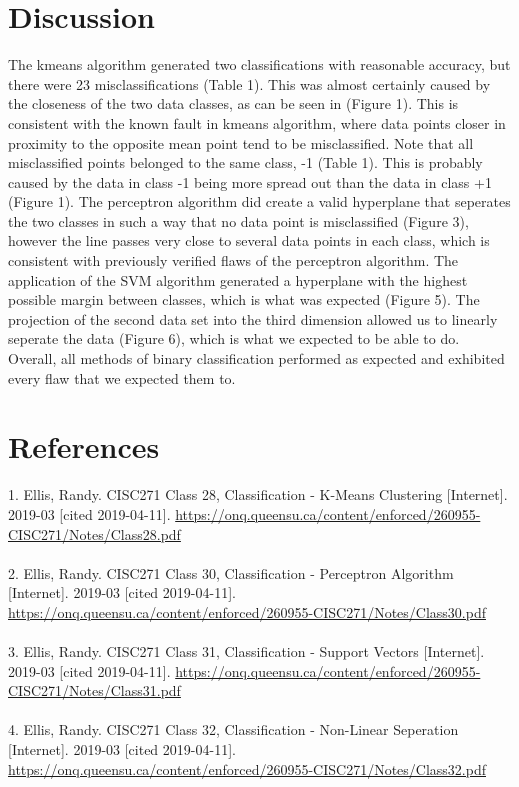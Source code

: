 \documentclass{article}
\begin{document}
	\section*{Discussion}
	The kmeans algorithm generated two classifications with reasonable accuracy, but there were 23 misclassifications (Table 1). This was almost certainly caused by the closeness of the two data classes, as can be seen in (Figure 1). This is consistent with the known fault in kmeans algorithm, where data points closer in proximity to the opposite mean point tend to be misclassified. Note that all misclassified points belonged to the same class, -1 (Table 1). This is probably caused by the data in class -1 being more spread out than the data in class +1 (Figure 1). The perceptron algorithm did create a valid hyperplane that seperates the two classes in such a way that no data point is misclassified (Figure 3), however the line passes very close to several data points in each class, which is consistent with previously verified flaws of the perceptron algorithm. The application of the SVM algorithm generated a hyperplane with the highest possible margin between classes, which is what was expected (Figure 5). The projection of the second data set into the third dimension allowed us to linearly seperate the data (Figure 6), which is what we expected to be able to do. Overall, all methods of binary classification performed as expected and exhibited every flaw that we expected them to. 
	\section*{References}
	1. Ellis, Randy. CISC271 Class 28, Classification - K-Means Clustering [Internet]. 2019-03 [cited 2019-04-11]. \url{https://onq.queensu.ca/content/enforced/260955-CISC271/Notes/Class28.pdf}\\\\
	2. Ellis, Randy. CISC271 Class 30, Classification - Perceptron Algorithm [Internet]. 2019-03 [cited 2019-04-11]. \url{https://onq.queensu.ca/content/enforced/260955-CISC271/Notes/Class30.pdf}\\\\
	3. Ellis, Randy. CISC271 Class 31, Classification - Support Vectors [Internet]. 2019-03 [cited 2019-04-11]. \url{https://onq.queensu.ca/content/enforced/260955-CISC271/Notes/Class31.pdf}\\\\
	4. Ellis, Randy. CISC271 Class 32, Classification - Non-Linear Seperation [Internet]. 2019-03 [cited 2019-04-11]. \url{https://onq.queensu.ca/content/enforced/260955-CISC271/Notes/Class32.pdf}\\\\
\end{document}
